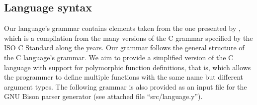 \subsection{Language syntax}

Our language's grammar contains elements taken from the one presented by \textcite{Harbison2002},
which is a compilation from the many versions of the C grammar specified by the ISO C Standard
along the years. Our grammar follows the general structure of the C language's grammar.
We aim to provide a simplified version of the C language with support for polymorphic function
definitions, that is, which allows the programmer to define multiple functions with the same name
but different argument types. The following grammar is also provided as an input file for the
GNU Bison \cite{BISON} parser generator (see attached file ``src/language.y'').

